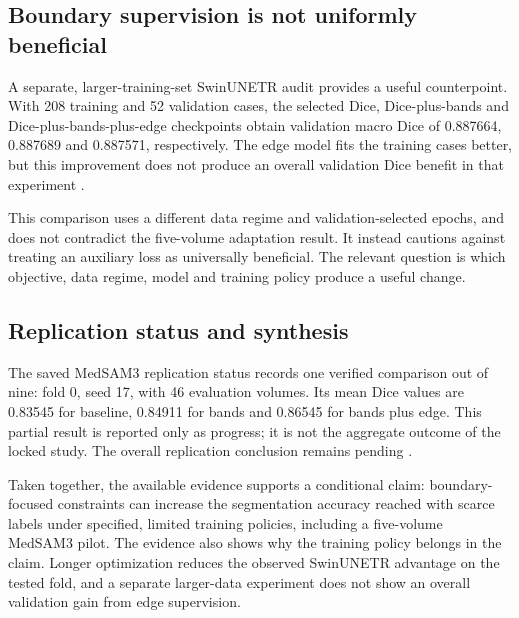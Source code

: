 \subsection{Boundary supervision is not uniformly beneficial}
A separate, larger-training-set SwinUNETR audit provides a useful counterpoint. With 208 training and 52 validation cases, the selected Dice, Dice-plus-bands and Dice-plus-bands-plus-edge checkpoints obtain validation macro Dice of 0.887664, 0.887689 and 0.887571, respectively. The edge model fits the training cases better, but this improvement does not produce an overall validation Dice benefit in that experiment \cite{localEdgeAudit}.

This comparison uses a different data regime and validation-selected epochs, and does not contradict the five-volume adaptation result. It instead cautions against treating an auxiliary loss as universally beneficial. The relevant question is which objective, data regime, model and training policy produce a useful change.

\subsection{Replication status and synthesis}
The saved MedSAM3 replication status records one verified comparison out of nine: fold 0, seed 17, with 46 evaluation volumes. Its mean Dice values are 0.83545 for baseline, 0.84911 for bands and 0.86545 for bands plus edge. This partial result is reported only as progress; it is not the aggregate outcome of the locked study. The overall replication conclusion remains pending \cite{localMedSAMreplication}.

Taken together, the available evidence supports a conditional claim: boundary-focused constraints can increase the segmentation accuracy reached with scarce labels under specified, limited training policies, including a five-volume MedSAM3 pilot. The evidence also shows why the training policy belongs in the claim. Longer optimization reduces the observed SwinUNETR advantage on the tested fold, and a separate larger-data experiment does not show an overall validation gain from edge supervision.

